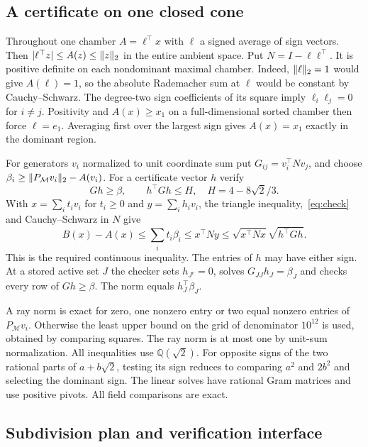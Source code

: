 \subsection{A certificate on one closed cone}

Throughout one chamber $A=\ell^\top x$ with $\ell$ a signed
average of sign vectors. Then $|\ell^\top z|\le A(z)\le\lVert z\rVert_2$
in the entire ambient space. Put $N=I-\ell\ell^\top$. It is positive
definite on each nondominant maximal chamber. Indeed,
$\lVert \ell\rVert_2=1$ would give $A(\ell)=1$, so the absolute Rademacher
sum at $\ell$ would be constant by Cauchy--Schwarz. The degree-two
sign coefficients of its square imply $\ell_i\ell_j=0$ for $i\ne j$.
Positivity and $A(x)\ge x_1$ on a full-dimensional sorted chamber
then force $\ell=e_1$. Averaging first over the largest sign gives
$A(x)=x_1$ exactly in the dominant region.

For generators $v_i$ normalized to unit coordinate sum put
$G_{ij}=v_i^\top N v_j$, and choose
$\beta_i\ge \lVert P_\mathcal M v_i\rVert_2-A(v_i)$. For a certificate
vector $h$ verify
\begin{equation}
 Gh\ge\beta,\qquad h^\top Gh\le H,\quad H=4-8\sqrt2/3 .
 \label{eq:check}
\end{equation}
With $x=\sum_i t_i v_i$ for $t_i\ge0$ and $y=\sum_i h_i v_i$,
the triangle inequality,~\eqref{eq:check} and Cauchy--Schwarz
in $N$ give
\[
 B(x)-A(x)\le\sum_i t_i\beta_i
 \le x^\top Ny\le \sqrt{x^\top Nx}\sqrt{h^\top Gh}.
\]
This is the required continuous inequality. The entries of $h$
may have either sign. At a stored active set $J$ the checker sets
$h_{J^c}=0$, solves $G_{JJ}h_J=\beta_J$ and checks every row of
$Gh\ge\beta$. The norm equals $h_J^\top\beta_J$.

A ray norm is exact for zero, one nonzero entry or two equal nonzero
entries of $P_\mathcal M v_i$. Otherwise the least upper bound on
the grid of denominator $10^{12}$ is used, obtained by comparing
squares. The ray norm is at most one by unit-sum normalization.
All inequalities use $\mathbb Q(\sqrt2)$. For opposite signs of
the two rational parts of $a+b\sqrt2$, testing its sign reduces
to comparing $a^2$ and $2b^2$ and selecting the dominant sign.
The linear solves have rational Gram matrices and use positive
pivots. All field comparisons are exact.

\subsection{Subdivision plan and verification interface}

